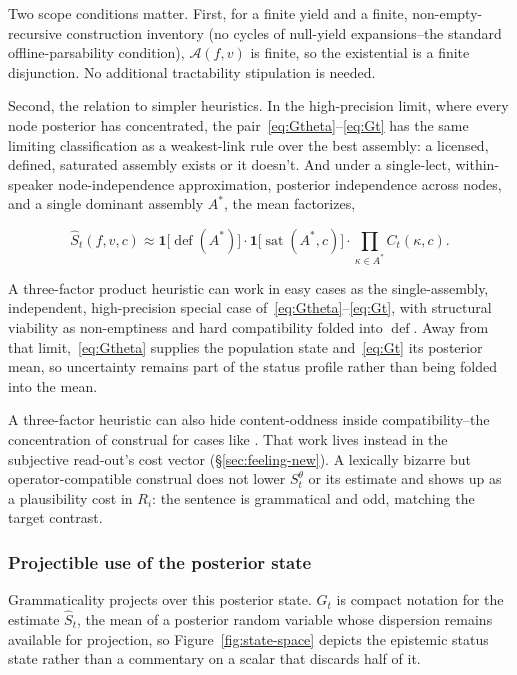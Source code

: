 Two scope conditions matter. First, for a finite yield and a finite,
non-empty-recursive construction inventory (no cycles of null-yield
expansions--the standard offline-parsability condition), $\mathcal{A}(f,v)$ is
finite, so the existential is a finite disjunction. No additional tractability
stipulation is needed.

Second, the relation to simpler heuristics. In the high-precision limit, where
every node posterior has concentrated, the pair~\eqref{eq:Gtheta}--\eqref{eq:Gt}
has the same limiting
classification as a weakest-link rule over the best assembly: a licensed,
defined, saturated assembly exists or it doesn't. And under a single-lect,
within-speaker node-independence approximation, posterior independence across
nodes, and a single dominant assembly $A^{\ast}$, the mean factorizes,

\begin{equation}
\widehat{S}_t(f,v,c)\approx \mathbf{1}\bigl[\operatorname{def}(A^{\ast})\bigr]
\cdot \mathbf{1}\bigl[\operatorname{sat}(A^{\ast},c)\bigr]
\cdot \prod_{\kappa\in A^{\ast}} C_t(\kappa,c).
\end{equation}

\noindent A three-factor product heuristic can work in easy cases as the
single-assembly, independent, high-precision special case
of~\eqref{eq:Gtheta}--\eqref{eq:Gt}, with structural viability as non-emptiness and
hard compatibility folded into $\operatorname{def}$. Away from that
limit,~\eqref{eq:Gtheta} supplies the population state and~\eqref{eq:Gt} its posterior
mean, so uncertainty remains part of the status profile rather than being folded
into the mean.

A three-factor heuristic can also hide content-oddness inside compatibility--the
concentration of construal for cases like . That
work lives instead in the subjective read-out's cost vector
(\S\ref{sec:feeling-new}). A lexically bizarre but operator-compatible construal
does not lower $S_t^{\theta}$ or its estimate and shows up as a plausibility
cost in $R_i$: the sentence is grammatical and odd, matching the target
contrast.

\subsubsection{Projectible use of the posterior state}
\label{sec:projectible-use}
\label{sec:projectible-G}

Grammaticality projects over this posterior state. $G_t$ is compact notation for
the estimate $\widehat{S}_t$, the mean of a posterior random variable whose
dispersion remains available for projection, so
Figure~\ref{fig:state-space} depicts the epistemic status state rather than a
commentary on a scalar that discards half of it.

